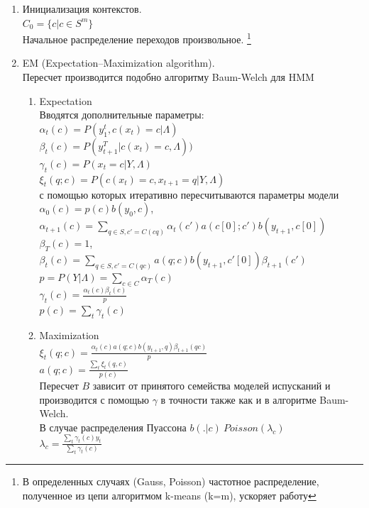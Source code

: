 \documentclass{matmex-diploma-custom}
\begin{document}
\begin{enumerate}
\item Инициализация контекстов.
\\
$ C_{0} = \{c| c\in S^{m}\}$
\\
Начальное распределение переходов произвольное.
\footnote{В определенных случаях (Gauss, Poisson) частотное распределение, полученное из цепи алгоритмом k-means (k=m), ускоряет работу}
\\
\item EM (Expectation–Maximization algorithm).
\\
Пересчет производится подобно алгоритму Baum-Welch для HMM
\\
\begin{enumerate}
\item Expectation
\\
Вводятся дополнительные параметры:
\\
$ \alpha_{t}(c) = P(y_{1}^{t}, c(x_{t})=c| \Lambda)$
\\
$ \beta_{t}(c) = P(y_{t+1}^{T}| c(x_{t})=c, \Lambda))$
\\
$ \gamma_{t}(c) = P(x_{t}=c|Y,\Lambda) $
\\
$ \xi_{t}(q;c) = P(c(x_{t})=c, x_{t+1} = q| Y, \Lambda)$
\\
с помощью которых итеративно пересчитываются параметры модели
\\
$ \alpha_{0}(c) = p(c)b(y_{0},c)$, 
$ \alpha_{t+1}(c) = \sum_{q \in S, c'=C(cq)}{\alpha_{t}(c')a(c[0];c')b(y_{t+1},c[0])}$
\\
$ \beta_{T}(c) = 1$, 
$ \beta_{t}(c) = \sum_{q \in S, c'=C(qc)}{a(q;c)b(y_{t+1}, c'[0])\beta_{t+1}(c')}$
\\
$p = P(Y|\Lambda) = \sum_{c \in C}\alpha_{T}(c)$
\\ 
$ \gamma_{t}(c) = \frac{\alpha_{t}(c)\beta_{t}(c)}{p}$
\\
$p(c) = \sum_{t}\gamma_{t}(c)$
\item Maximization
\\
$ \xi_{t}(q;c) = \frac{\alpha_{t}(c)a(q;c)b(y_{t+1},q)\beta_{t+1}(qc)}{p} $
\\
$ a(q; c) = \frac{\sum_{t}\xi_{t}(q,c)}{p(c)}$
\\
Пересчет $ B $ зависит от принятого семейства моделей испусканий и производится с помощью $ \gamma $ в точности также как и в алгоритме Baum-Welch.
\\
В случае распределения Пуассона
$b(.|c) ~ Poisson(\lambda_{c})$ 
\\
$ \lambda_{c} = \frac{\sum_{t}{\gamma_{t}(c)y_{t}}}{\sum_{t}{\gamma_{t}(c)}}$

\end{enumerate}
\end{enumerate}
\end{document}
